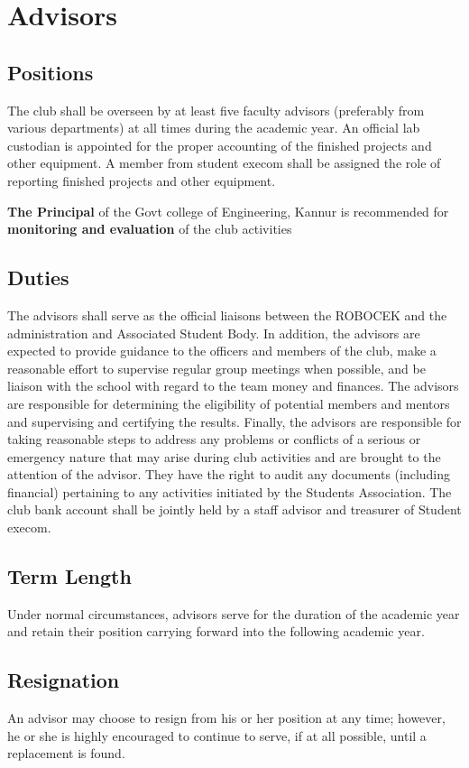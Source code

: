 \section{Advisors}

\subsection{Positions}
The club shall be overseen by at least five faculty advisors (preferably from various departments) at all times during the academic year. An official lab custodian is appointed for the proper accounting of the finished projects and other equipment. A member from student execom shall be assigned the role of reporting finished projects and other equipment.

\textbf{The Principal} of the Govt college of Engineering, Kannur is recommended for \textbf{monitoring and evaluation} of the club activities

\subsection{Duties}
The advisors shall serve as the official liaisons between the ROBOCEK and the administration and Associated Student Body. In addition, the advisors are expected to provide guidance to the officers and members of the club, make a reasonable effort to supervise regular group meetings when possible, and be liaison with the school with regard to the team money and finances. The advisors are responsible for determining the eligibility of potential members and mentors and supervising and certifying the results. Finally, the advisors are responsible for taking reasonable steps to address any problems or conflicts of a serious or emergency nature that may arise during club activities and are brought to the attention of the advisor. They have the right to audit any documents (including financial) pertaining to any activities initiated by the Students Association. The club bank account shall be jointly held by a staff advisor and treasurer of Student execom.

\subsection{Term Length}
Under normal circumstances, advisors serve for the duration of the academic year and retain their position carrying forward into the following  academic year.

\subsection{Resignation}
An advisor may choose to resign from his or her position at any time; however, he or she is highly encouraged to continue to serve, if at all possible, until a replacement is found.


